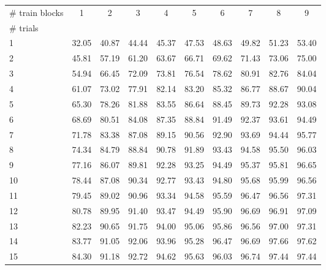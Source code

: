 \begin{tabularx}{\textwidth}{@{}Xccccccccc@{}}
\toprule
\# train blocks & 1 & 2 & 3 & 4 & 5 & 6 & 7 & 8 & 9 \\
\# trials &  &  &  &  &  &  &  &  &  \\
\midrule
1 & 32.05 & 40.87 & 44.44 & 45.37 & 47.53 & 48.63 & 49.82 & 51.23 & 53.40 \\
2 & 45.81 & 57.19 & 61.20 & 63.67 & 66.71 & 69.62 & 71.43 & 73.06 & 75.00 \\
3 & 54.94 & 66.45 & 72.09 & 73.81 & 76.54 & 78.62 & 80.91 & 82.76 & 84.04 \\
4 & 61.07 & 73.02 & 77.91 & 82.14 & 83.20 & 85.32 & 86.77 & 88.67 & 90.04 \\
5 & 65.30 & 78.26 & 81.88 & 83.55 & 86.64 & 88.45 & 89.73 & 92.28 & 93.08 \\
6 & 68.69 & 80.51 & 84.08 & 87.35 & 88.84 & 91.49 & 92.37 & 93.61 & 94.49 \\
7 & 71.78 & 83.38 & 87.08 & 89.15 & 90.56 & 92.90 & 93.69 & 94.44 & 95.77 \\
8 & 74.34 & 84.79 & 88.84 & 90.78 & 91.89 & 93.43 & 94.58 & 95.50 & 96.03 \\
9 & 77.16 & 86.07 & 89.81 & 92.28 & 93.25 & 94.49 & 95.37 & 95.81 & 96.65 \\
10 & 78.44 & 87.08 & 90.34 & 92.77 & 93.43 & 94.80 & 95.68 & 95.99 & 96.56 \\
11 & 79.45 & 89.02 & 90.96 & 93.34 & 94.58 & 95.59 & 96.47 & 96.56 & 97.31 \\
12 & 80.78 & 89.95 & 91.40 & 93.47 & 94.49 & 95.90 & 96.69 & 96.91 & 97.09 \\
13 & 82.23 & 90.65 & 91.75 & 94.00 & 95.06 & 95.86 & 96.56 & 97.00 & 97.31 \\
14 & 83.77 & 91.05 & 92.06 & 93.96 & 95.28 & 96.47 & 96.69 & 97.66 & 97.62 \\
15 & 84.30 & 91.18 & 92.72 & 94.62 & 95.63 & 96.03 & 96.74 & 97.44 & 97.44 \\
\bottomrule
\end{tabularx}
